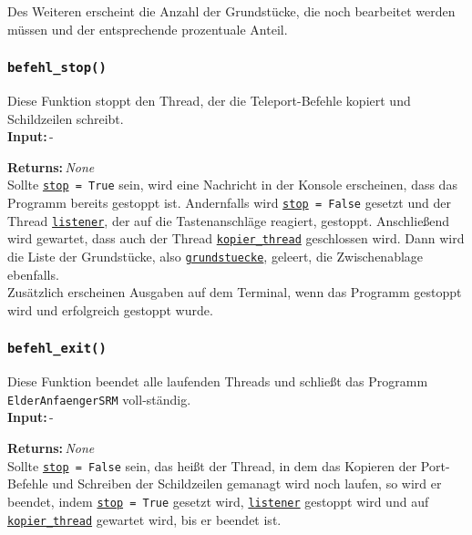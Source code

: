 \documentclass{article}
\newcommand{\bfpara}[1]{\noindent \textbf{#1:}\,}
\begin{document}
Des Weiteren erscheint die Anzahl der Grundst\"ucke, die noch bearbeitet werden m\"ussen und der entsprechende prozentuale Anteil.\\[11pt] 

\subsubsection*{\texttt{befehl\_stop()}}
Diese Funktion stoppt den Thread, der die Teleport-Befehle kopiert und Schildzeilen schreibt.\\

\bfpara{Input}-

\bfpara{Returns}\textit{None}\\

Sollte \hyperref[subsec:globale_variablen]{\texttt{stop}}\texttt{ = True} sein, wird eine Nachricht in der Konsole erscheinen, dass das Programm bereits gestoppt ist. Andernfalls wird \hyperref[subsec:globale_variablen]{\texttt{stop}}\texttt{ = False} gesetzt und der Thread \hyperref[subsec:globale_variablen]{\texttt{listener}}, der auf die Tastenanschl\"age reagiert, gestoppt. Anschlie{\ss}end wird gewartet, dass auch der Thread \hyperref[subsec:globale_variablen]{\texttt{kopier\_thread}} geschlossen wird. Dann wird die Liste der Grundst\"ucke, also \hyperref[subsec:globale_variablen]{\texttt{grundstuecke}}, geleert, die Zwischenablage ebenfalls.\\

Zus\"atzlich erscheinen Ausgaben auf dem Terminal, wenn das Programm gestoppt wird und erfolgreich gestoppt wurde.\\[11pt]

\subsubsection*{\texttt{befehl\_exit()}}
Diese Funktion beendet alle laufenden Threads und schlie{\ss}t das Programm \texttt{ElderAnfaengerSRM} voll-st\"andig.\\

\bfpara{Input}-

\bfpara{Returns}\textit{None}\\

Sollte \hyperref[subsec:globale_variablen]{\texttt{stop}}\texttt{ = False} sein, das hei{\ss}t der Thread, in dem das Kopieren der Port-Befehle und Schreiben der Schildzeilen gemanagt wird noch laufen, so wird er beendet, indem \hyperref[subsec:globale_variablen]{\texttt{stop}}\texttt{ = True} gesetzt wird, \hyperref[subsec:globale_variablen]{\texttt{listener}} gestoppt wird und auf \hyperref[subsec:globale_variablen]{\texttt{kopier\_thread}} gewartet wird, bis er beendet ist.\\[11pt]
\end{document}
